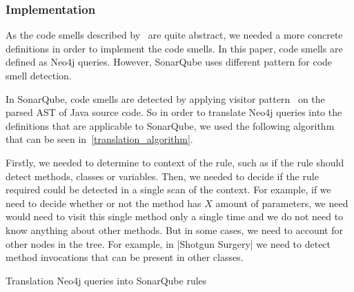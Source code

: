 
\subsubsection{Implementation}


As the code smells described by~\citeauthor{refactoring-fowler} are quite abstract, we needed
a more concrete definitions in order to implement the code smells.
In this paper, code smells are defined as Neo4j queries.
However, SonarQube uses different pattern for code smell detection.

In SonarQube, code smells are detected by applying visitor pattern~\cite{visitor_pattern} on the parsed
AST of Java source code.
So in order to translate Neo4j queries into the definitions that are applicable to SonarQube, we used the following
algorithm that can be seen in~\ref{translation_algorithm}.

Firstly, we needed to determine to context of the rule, such as if the rule should detect methods, classes or variables.
Then, we needed to decide if the rule required could be detected in a single scan of the context.
For example, if we need to decide whether or not the method has $X$ amount of parameters, we need would need to visit
this single method only a single time and we do not need to know anything about other methods.
But in some cases, we need to account for other nodes in the tree.
For example, in \verbatim|Shotgun Surgery| we need to detect method invocations that can be present in other classes.

\begin{algorithm}
    \label{translation_algorithm}
    \caption{Translation Neo4j queries into SonarQube rules}
    \BlankLine

\end{algorithm}

